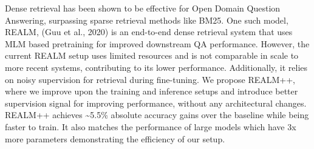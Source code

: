 Dense retrieval has been shown to be effective for Open Domain Question Answering, surpassing sparse retrieval methods like BM25. One such  model, REALM, (Guu et al., 2020) is an end-to-end dense retrieval system that uses MLM based pretraining for improved downstream QA performance. However, the current REALM setup uses limited resources and is not comparable in scale to more recent systems, contributing to its lower performance. Additionally, it relies on noisy supervision for retrieval during fine-tuning. We propose REALM++, where we improve upon the training and inference setups and introduce better supervision signal for improving performance, without any architectural changes. REALM++ achieves {\textasciitilde}5.5\% absolute accuracy gains over the baseline while being faster to train. It also matches the performance of large models which have 3x more parameters demonstrating the efficiency of our setup.
